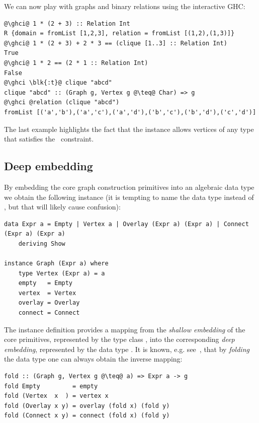 We can now play with graphs and binary relations using the interactive GHC:

\begin{verbatim}
@\ghci@ 1 * (2 + 3) :: Relation Int
R {domain = fromList [1,2,3], relation = fromList [(1,2),(1,3)]}
@\ghci@ 1 * (2 + 3) + 2 * 3 == (clique [1..3] :: Relation Int)
True
@\ghci@ 1 * 2 == (2 * 1 :: Relation Int)
False
@\ghci \blk{:t}@ clique "abcd"
clique "abcd" :: (Graph g, Vertex g @\teq@ Char) => g
@\ghci @relation (clique "abcd")
fromList [('a','b'),('a','c'),('a','d'),('b','c'),('b','d'),('c','d')]
\end{verbatim}

\noindent
The last example highlights the fact that the  instance allows vertices
of any type  that satisfies the~ constraint.

\subsection{Deep embedding}\label{sub-embedding}

By embedding the core graph construction primitives into an algebraic data type 
we obtain the following  instance (it is tempting to name the data type
 instead of , but that will likely cause confusion):

\begin{verbatim}
data Expr a = Empty | Vertex a | Overlay (Expr a) (Expr a) | Connect (Expr a) (Expr a)
    deriving Show

instance Graph (Expr a) where
    type Vertex (Expr a) = a
    empty   = Empty
    vertex  = Vertex
    overlay = Overlay
    connect = Connect
\end{verbatim}

The instance definition provides a mapping from the \emph{shallow embedding}
of the core primitives, represented by the type class , into the
corresponding \emph{deep embedding}, represented by the data type .
It is known, e.g. see~\citet{2014_gibbons_folding}, that by \emph{folding} the data
type one can always obtain the inverse mapping:

\begin{verbatim}
fold :: (Graph g, Vertex g @\teq@ a) => Expr a -> g
fold Empty         = empty
fold (Vertex  x  ) = vertex x
fold (Overlay x y) = overlay (fold x) (fold y)
fold (Connect x y) = connect (fold x) (fold y)
\end{verbatim}

